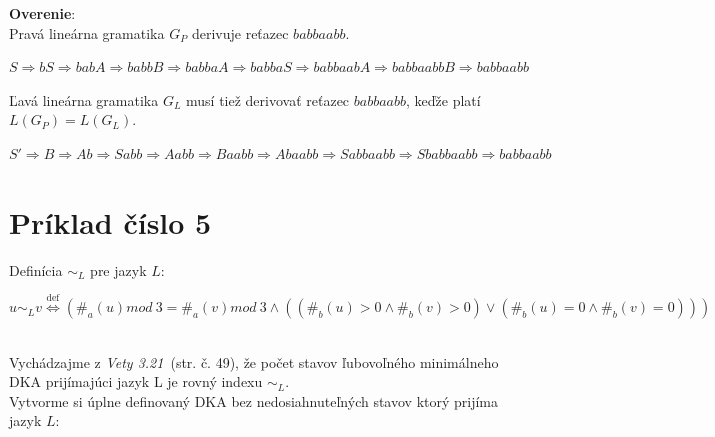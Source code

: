 \documentclass[11pt,a4paper]{article}
\begin{document}
\textbf{Overenie}:\\
Pravá lineárna gramatika $G_P$ derivuje reťazec $babbaabb$.
\begin{center}
$S \Rightarrow bS \Rightarrow babA  \Rightarrow babbB \Rightarrow babbaA \Rightarrow babbaS \Rightarrow babbaabA \Rightarrow babbaabbB \Rightarrow babbaabb$
\end{center}

Ľavá lineárna gramatika $G_L$ musí tiež derivovať reťazec $babbaabb$, keďže platí $L(G_P)=L(G_L)$.
\begin{center}
$S' \Rightarrow B \Rightarrow Ab \Rightarrow Sabb \Rightarrow Aabb \Rightarrow Baabb \Rightarrow Abaabb \Rightarrow Sabbaabb \Rightarrow Sbabbaabb \Rightarrow babbaabb$
\end{center}




\section{Príklad číslo 5}

Definícia $\sim_L$ pre jazyk $L$:\\[-1.5em]
\begin{center}
$u \sim_L v \stackrel{\text{def}}{\Longleftrightarrow} (\#_a(u)mod\ 3 = \#_a(v)mod\ 3 \wedge ((\#_b(u) > 0 \wedge \#_b(v) > 0) \vee (\#_b(u) = 0 \wedge \#_b(v) = 0)))$
\end{center}

\hfill\\

Vychádzajme z \textit{Vety 3.21}~\cite{TIN}(str. č. 49), že počet stavov ľubovoľného minimálneho DKA prijímajúci jazyk L je rovný indexu $\sim_L$.\\

Vytvorme si úplne definovaný DKA bez nedosiahnuteľných stavov ktorý prijíma jazyk $L$:
\end{document}
